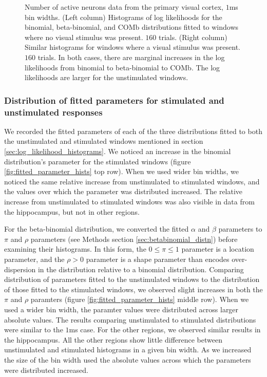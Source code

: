 \begin{figure}[p]
\begin{subfigure}[h]{0.5\linewidth}
        \label{fig:v1_comb_1ms_stimulated_log_likelihood_hist}
      \end{subfigure}
      \caption{Number of active neurons data from the primary visual cortex, $1$ms bin widths. (Left column) Histograms of log likelihoods for the binomial, beta-binomial, and COMb distributions fitted to windows where no visual stimulus was present. $160$ trials. (Right column) Similar histograms for windows where a visual stimulus was present. $160$ trials. In both cases, there are marginal increases in the log likelihoods from binomial to beta-binomial to COMb. The log likelihoods are larger for the unstimulated windows.}
      \label{fig:log_likelihood_histograms}
    \end{figure}

    \subsubsection{Distribution of fitted parameters for stimulated and unstimulated responses}
    We recorded the fitted parameters of each of the three distributions fitted to both the unstimulated and stimulated windows mentioned in section \ref{sec:log_likelihood_histograms}. We noticed an increase in the binomial distribution's parameter for the stimulated windows (figure \ref{fig:fitted_parameter_hists} top row). When we used wider bin widths, we noticed the same relative increase from unstimulated to stimulated windows, and the values over which the parameter was distributed increased. The relative increase from unstimulated to stimulated windows was also visible in data from the hippocampus, but not in other regions.

    For the beta-binomial distribution, we converted the fitted $\alpha$ and $\beta$ parameters to $\pi$ and $\rho$ parameters (see Methods section \ref{sec:betabinomial_distn}) before examining their histograms. In this form, the $0 \leq \pi \leq 1$ parameter is a location parameter, and the $\rho > 0$ parameter is a shape parameter than encodes over-dispersion in the distribution relative to a binomial distribution. Comparing distribution of parameters fitted to the unstimulated windows to the distribution of those fitted to the stimulated windows, we observed slight increases in both the $\pi$ and $\rho$ paramters (figure \ref{fig:fitted_parameter_hists} middle row). When we used a wider bin width, the paramter values were distributed across larger absolute values. The results comparing unstimulated to stimulated distributions were similar to the $1$ms case. For the other regions, we observed similar results in the hippocampus. All the other regions show little difference between unstimulated and stimulated histograms in a given bin width. As we increased the size of the bin width used the absolute values across which the parameters were distributed increased.

